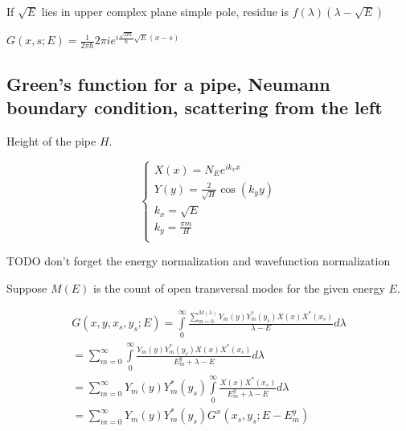 \documentclass[12pt, a4paper]{article}
\begin{document}
If $\sqrt{E}$ lies in upper complex plane simple pole, residue is $f(\lambda) (\lambda - \sqrt{E})$

  

$G(x, s; E) = \frac{1}{2 \pi \hbar} 2 \pi i e^{i \frac{\sqrt{2 m}}{\hbar} \sqrt{E} (x - s)}$

\subsection{Green's function for a pipe, Neumann boundary condition, scattering from the left}

Height of the pipe $H$.

$$\begin{cases}
X(x) = N_E e^{i k_x x} \\
Y(y) = \frac{2}{\sqrt{H}} \cos(k_y y) \\
k_x = \sqrt{E} \\
k_y = \frac{\pi m}{H} \\
\end{cases}$$

TODO don't forget the energy normalization and wavefunction normalization

Suppose $M(E)$ is the count of open transversal modes for the given energy $E$.

\begin{align*}
G(x, y, x_s, y_s; E) = \int\limits_{0}^{\infty} \frac{\sum\limits_{m = 0}^{M(\lambda)} Y_m(y) Y^*_m(y_s) X(x) X^*(x_s)  }{\lambda - E} d \lambda \\
= \sum_{m = 0}^\infty \int\limits_{0}^\infty \frac{Y_m(y) Y_m^*(y_s) X(x) X^*(x_s)}{E^y_m + \lambda - E} d\lambda \\
= \sum_{m = 0}^\infty Y_m(y) Y^*_m(y_s) \int\limits_{0}^\infty \frac{X(x) X^*(x_s)}{E^y_m + \lambda - E} d\lambda \\
= \sum_{m = 0}^\infty Y_m(y) Y^*_m(y_s) G^x(x_s, y_s; E - E^y_m) \\
\end{align*}
\end{document}
